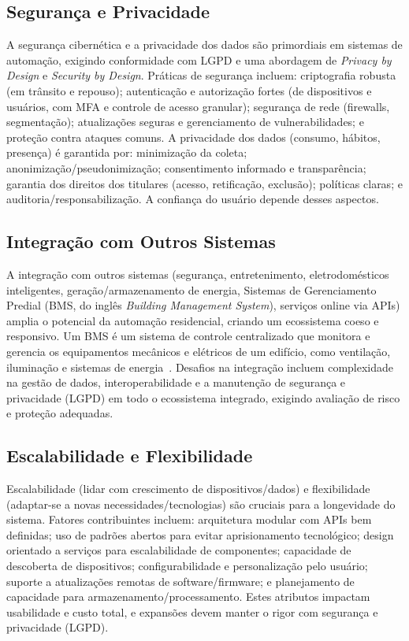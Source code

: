 \subsection{Segurança e Privacidade}
A segurança cibernética e a privacidade dos dados são primordiais em sistemas de automação, exigindo conformidade com LGPD e uma abordagem de \textit{Privacy by Design} e \textit{Security by Design}.
Práticas de segurança incluem: criptografia robusta (em trânsito e repouso); autenticação e autorização fortes (de dispositivos e usuários, com MFA e controle de acesso granular); segurança de rede (firewalls, segmentação); atualizações seguras e gerenciamento de vulnerabilidades; e proteção contra ataques comuns.
A privacidade dos dados (consumo, hábitos, presença) é garantida por: minimização da coleta; anonimização/pseudonimização; consentimento informado e transparência; garantia dos direitos dos titulares (acesso, retificação, exclusão); políticas claras; e auditoria/responsabilização. A confiança do usuário depende desses aspectos.

\subsection{Integração com Outros Sistemas}
A integração com outros sistemas (segurança, entretenimento, eletrodomésticos inteligentes, geração/armazenamento de energia, Sistemas de Gerenciamento Predial (BMS, do inglês \textit{Building Management System}), serviços online via APIs) amplia o potencial da automação residencial, criando um ecossistema coeso e responsivo. Um BMS é um sistema de controle centralizado que monitora e gerencia os equipamentos mecânicos e elétricos de um edifício, como ventilação, iluminação e sistemas de energia~\cite{Lee2013BMS}. Desafios na integração incluem complexidade na gestão de dados, interoperabilidade e a manutenção de segurança e privacidade (LGPD) em todo o ecossistema integrado, exigindo avaliação de risco e proteção adequadas.

\subsection{Escalabilidade e Flexibilidade}
Escalabilidade (lidar com crescimento de dispositivos/dados) e flexibilidade (adaptar-se a novas necessidades/tecnologias) são cruciais para a longevidade do sistema. Fatores contribuintes incluem: arquitetura modular com APIs bem definidas; uso de padrões abertos para evitar aprisionamento tecnológico; design orientado a serviços para escalabilidade de componentes; capacidade de descoberta de dispositivos; configurabilidade e personalização pelo usuário; suporte a atualizações remotas de software/firmware; e planejamento de capacidade para armazenamento/processamento. Estes atributos impactam usabilidade e custo total, e expansões devem manter o rigor com segurança e privacidade (LGPD).

